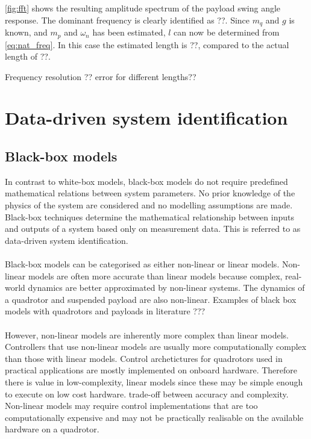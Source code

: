         \ref{fig:fft} 
        shows the resulting amplitude spectrum of the payload swing angle response.
        The dominant frequency is clearly identified as ??.
        Since $m_q$ and $g$ is known, and $m_p$ and $\omega_n$ has been estimated, $l$ can now be determined from
        \ref{eq:nat_freq}.
        In this case the estimated length is ??, compared to the actual length of ??.
        
        Frequency resolution ??
        error for different lengths??

\section{Data-driven system identification}
    \subsection{Black-box models}
        In contrast to white-box models, black-box models do not require predefined mathematical relations between system parameters.
        No prior knowledge of the physics of the system are considered and no modelling assumptions are made.
        Black-box techniques determine the mathematical relationship between inputs and outputs of a system based only on measurement data.
        This is referred to as data-driven system identification.

        \paragraph{}
        Black-box models can be categorised as either non-linear or linear models.
        Non-linear models are often more accurate than linear models because complex, real-world dynamics are better approximated by non-linear systems.
        The dynamics of a quadrotor and suspended payload are also non-linear.
        Examples of black box models with quadrotors and payloads in literature ???

        \paragraph{}
        However, non-linear models are inherently more complex than linear models. 
        Controllers that use non-linear models are usually more computationally complex than those with linear models.
        Control archetictures for quadrotors used in practical applications are mostly implemented on onboard hardware.
        Therefore there is value in low-complexity, linear models since these may be simple enough to execute on low cost hardware.
        trade-off between accuracy and complexity.
        Non-linear models may require control implementations that are too computationally expensive and may not be practically realisable on the available hardware on a quadrotor.
        
